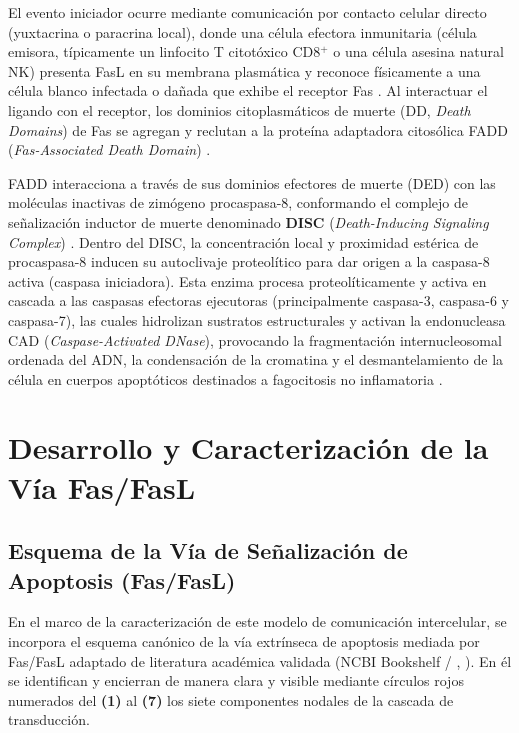 \documentclass[spanish,letterpaper,oneside]{article}
\begin{document}
El evento iniciador ocurre mediante comunicación por contacto celular directo (yuxtacrina o paracrina local), donde una célula efectora inmunitaria (célula emisora, típicamente un linfocito T citotóxico CD8$^+$ o una célula asesina natural NK) presenta FasL en su membrana plasmática y reconoce físicamente a una célula blanco infectada o dañada que exhibe el receptor Fas \parencite{strasser2009many}. Al interactuar el ligando con el receptor, los dominios citoplasmáticos de muerte (DD, \emph{Death Domains}) de Fas se agregan y reclutan a la proteína adaptadora citosólica FADD (\emph{Fas-Associated Death Domain}) \parencite{scott2009fas}.

FADD interacciona a través de sus dominios efectores de muerte (DED) con las moléculas inactivas de zimógeno procaspasa-8, conformando el complejo de señalización inductor de muerte denominado \textbf{DISC} (\emph{Death-Inducing Signaling Complex}) \parencite{scott2009fas,lodish2021molecular}. Dentro del DISC, la concentración local y proximidad estérica de procaspasa-8 inducen su autoclivaje proteolítico para dar origen a la caspasa-8 activa (caspasa iniciadora). Esta enzima procesa proteolíticamente y activa en cascada a las caspasas efectoras ejecutoras (principalmente caspasa-3, caspasa-6 y caspasa-7), las cuales hidrolizan sustratos estructurales y activan la endonucleasa CAD (\emph{Caspase-Activated DNase}), provocando la fragmentación internucleosomal ordenada del ADN, la condensación de la cromatina y el desmantelamiento de la célula en cuerpos apoptóticos destinados a fagocitosis no inflamatoria \parencite{alberts2022molecular,caulfield2014disruption}.

\section{Desarrollo y Caracterización de la Vía Fas/FasL}
\subsection{Esquema de la Vía de Señalización de Apoptosis (Fas/FasL)}
En el marco de la caracterización de este modelo de comunicación intercelular, se incorpora el esquema canónico de la vía extrínseca de apoptosis mediada por Fas/FasL adaptado de literatura académica validada (NCBI Bookshelf / \citeauthor{strasser2009many}, \citeyear{strasser2009many}). En él se identifican y encierran de manera clara y visible mediante círculos rojos numerados del \textbf{(1)} al \textbf{(7)} los siete componentes nodales de la cascada de transducción.
\end{document}
